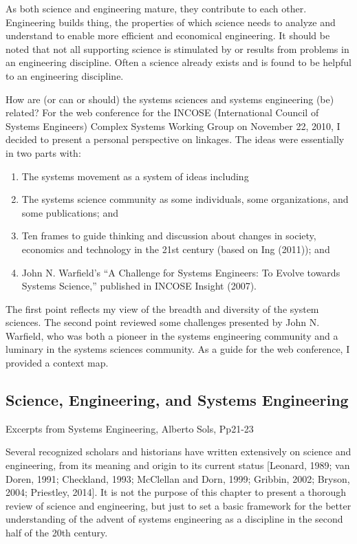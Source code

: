 As both science and engineering mature, they contribute to each other. Engineering builds thing, the properties of which science needs to analyze and understand to enable more efficient and economical engineering. It should be noted that not all supporting science is stimulated by or results from problems in an engineering discipline. Often a science already exists and is found to be helpful to an engineering discipline.

How are (or can or should) the systems sciences and systems engineering (be) related?  For the web conference for the INCOSE (International Council of Systems Engineers) Complex Systems Working Group on November 22, 2010, I decided to present a personal perspective on linkages. The ideas were essentially in two parts with:

\begin{enumerate}
\item The systems movement as a system of ideas including
\item The systems science community as some individuals, some organizations, and some publications; and
\item Ten frames to guide thinking and discussion about changes in society, economics and technology in the 21st century (based on Ing (2011)); and
\item John N. Warfield’s ``A Challenge for Systems Engineers: To Evolve towards Systems Science,'' published in INCOSE Insight (2007).
\end{enumerate}

The first point reflects my view of the breadth and diversity of the system sciences. The second point reviewed some challenges presented by John N. Warfield, who was both a pioneer in the systems engineering community and a luminary in the systems sciences community. As a guide for the web conference, I provided a context map.

\subsection{Science, Engineering, and Systems Engineering}

Excerpts from Systems Engineering, Alberto Sols, Pp21-23

Several recognized scholars and historians have written extensively on science and engineering, from its meaning and origin to its current status [Leonard, 1989; van Doren, 1991; Checkland, 1993; McClellan and Dorn, 1999; Gribbin, 2002; Bryson, 2004; Priestley, 2014]. It is not the purpose of this chapter to present a thorough review of science and engineering, but just to set a basic framework for the better understanding of the advent of systems engineering as a discipline in the second half of the 20th century.


